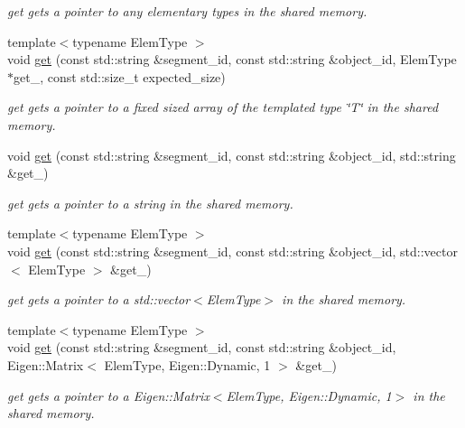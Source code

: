\begin{DoxyCompactItemize}
\begin{DoxyCompactList}\small\item\em get gets a pointer to any elementary types in the shared memory. \end{DoxyCompactList}\item 
{\footnotesize template$<$typename Elem\+Type $>$ }\\void \hyperlink{namespaceshared__memory_a6241b9143a2152b0c0beb784869373c7}{get} (const std\+::string \&segment\+\_\+id, const std\+::string \&object\+\_\+id, Elem\+Type $\ast$get\+\_\+, const std\+::size\+\_\+t expected\+\_\+size)
\begin{DoxyCompactList}\small\item\em get gets a pointer to a fixed sized array of the templated type \char`\"{}\+T\char`\"{} in the shared memory. \end{DoxyCompactList}\item 
void \hyperlink{namespaceshared__memory_a8a952cc446e3dce8fea8cd1ea02613f9}{get} (const std\+::string \&segment\+\_\+id, const std\+::string \&object\+\_\+id, std\+::string \&get\+\_\+)
\begin{DoxyCompactList}\small\item\em get gets a pointer to a string in the shared memory. \end{DoxyCompactList}\item 
{\footnotesize template$<$typename Elem\+Type $>$ }\\void \hyperlink{namespaceshared__memory_afd0ab66344562f5d927dea0d319a6a08}{get} (const std\+::string \&segment\+\_\+id, const std\+::string \&object\+\_\+id, std\+::vector$<$ Elem\+Type $>$ \&get\+\_\+)
\begin{DoxyCompactList}\small\item\em get gets a pointer to a std\+::vector$<$\+Elem\+Type$>$ in the shared memory. \end{DoxyCompactList}\item 
{\footnotesize template$<$typename Elem\+Type $>$ }\\void \hyperlink{namespaceshared__memory_a4e230e55e38089aee71cd6df93110174}{get} (const std\+::string \&segment\+\_\+id, const std\+::string \&object\+\_\+id, Eigen\+::\+Matrix$<$ Elem\+Type, Eigen\+::\+Dynamic, 1 $>$ \&get\+\_\+)
\begin{DoxyCompactList}\small\item\em get gets a pointer to a Eigen\+::\+Matrix$<$\+Elem\+Type, Eigen\+::\+Dynamic, 1$>$ in the shared memory. \end{DoxyCompactList}\item 

\end{DoxyCompactItemize}
